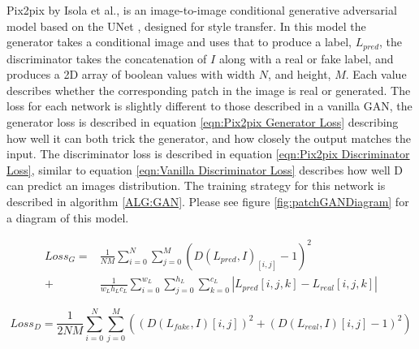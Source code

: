\documentclass{UoYCSproject}
\begin{document}

Pix2pix by Isola et al.\cite{isola2018imagetoimage}, is an image-to-image conditional generative adversarial model based on the UNet \cite{ronneberger2015unet}, designed for style transfer. In this model the generator takes a conditional image and uses that to produce a label, $L_{pred}$, the discriminator takes the concatenation of $I$ along with a real or fake label, and produces a 2D array of boolean values with width $N$, and height, $M$. Each value describes whether the corresponding patch in the image is real or generated. The loss for each network is slightly different to those described in a vanilla GAN, the generator loss is described in equation \ref{eqn:Pix2pix Generator Loss} describing how well it can both trick the generator, and how closely the output matches the input. The discriminator loss is described in equation \ref{eqn:Pix2pix Discriminator Loss}, similar to equation \ref{eqn:Vanilla Discriminator Loss} describes how well D can predict an images distribution. The training strategy for this network is described in algorithm \ref{ALG:GAN}. Please see figure \ref{fig:patchGANDiagram} for a diagram of this model.

\begin{equation}
    \label{eqn:Pix2pix Generator Loss}
    \begin{split}
    Loss_G = & \frac{1}{NM} \sum_{i=0}^{N} \sum_{j=0}^{M} (D(L_{pred}, I)_{[i,j]} -1 )^2\\
           + & \frac{1}{w_Lh_Lc_L} \sum_{i=0}^{w_L} \sum_{j=0}^{h_L} \sum_{k=0}^{c_L} |L_{pred}[i,j,k] - L_{real}[i,j,k]|
    \end{split}    
\end{equation}

\begin{equation}
    \label{eqn:Pix2pix Discriminator Loss}
    Loss_D = \frac{1}{2NM} \sum_{i=0}^{N}  \sum_{j=0}^{M} ( (D(L_{fake}, I)[i,j] )^2 + (D(L_{real}, I)[i,j] - 1)^2)
\end{equation}
\end{document}
